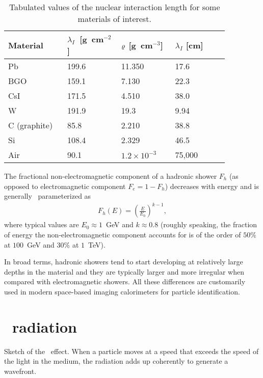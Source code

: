 \begin{table}[htb!]
  \begin{tabular}{p{0.23\linewidth}p{0.21\linewidth}p{0.21\linewidth}%
      p{0.21\linewidth}}
    \hline
    Material & $\lambda_I$~[g~cm$^{-2}$] & $\varrho$ [g~cm$^{-3}$] &
    $\lambda_I$ [cm]\\
    \hline
    \hline
    Pb & 199.6 & 11.350 & 17.6 \\
    BGO & 159.1 & 7.130 & 22.3 \\
    CsI & 171.5 & 4.510 & 38.0\\
    W & 191.9 & 19.3 & 9.94\\
    C (graphite) & 85.8 & 2.210 & 38.8\\
    Si & 108.4 & 2.329 & 46.5\\
    Air & 90.1 & $1.2 \times 10^{-3}$ & 75,000\\
    \hline
  \end{tabular}
  \caption{Tabulated values of the nuclear interaction length for some materials
    of interest.}
  \label{tab:exp_intlen}
\end{table}

The fractional non-electromagnetic component of a hadronic shower $F_h$ (as
opposed to electromagnetic component $F_e = 1 - F_h$) decreases with energy and
is generally~\cite{PDG} parameterized as
\begin{align}
  F_h(E) = \left( \frac{E}{E_0} \right)^{k-1},
\end{align}
where typical values are $E_0 \approx 1$~GeV and $k \approx 0.8$ (roughly
speaking, the fraction of energy the non-electromagnetic component accounts
for is of the order of $50\%$ at $100$~GeV and $30\%$ at $1$~TeV).

In broad terms, hadronic showers tend to start developing at relatively large
depths in the material and they are typically larger and more irregular when
compared with electromagnetic showers. All these differences are customarily used
in modern space-based imaging calorimeters for particle identification.


\section{\Cheren\ radiation}%
\label{sec:cherenkov_rad}

\begin{marginfigure}
  
  \caption{Sketch of the \Cheren\ effect. When a particle moves at a speed that
  exceeds the speed of the light in the medium, the radiation adds up coherently
  to generate a wavefront.}
  \label{fig:cherenkov_effect}
\end{marginfigure}

